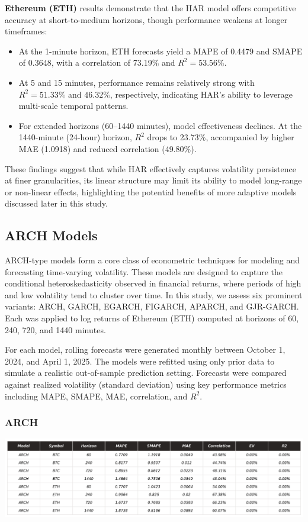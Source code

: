 \documentclass[9pt]{article}
\begin{document}
\begin{multicols}{2}
		\textbf{Ethereum (ETH)} results demonstrate that the HAR model offers competitive accuracy at short-to-medium horizons, though performance weakens at longer timeframes:
		\begin{itemize}
			\item At the 1-minute horizon, ETH forecasts yield a MAPE of 0.4479 and SMAPE of 0.3648, with a correlation of 73.19\% and \( R^2 = 53.56\% \).
			\item At 5 and 15 minutes, performance remains relatively strong with \( R^2 = 51.33\% \) and \( 46.32\% \), respectively, indicating HAR's ability to leverage multi-scale temporal patterns.
			\item For extended horizons (60–1440 minutes), model effectiveness declines. At the 1440-minute (24-hour) horizon, \( R^2 \) drops to 23.73\%, accompanied by higher MAE (1.0918) and reduced correlation (49.80\%).
		\end{itemize}
		
		These findings suggest that while HAR effectively captures volatility persistence at finer granularities, its linear structure may limit its ability to model long-range or non-linear effects, highlighting the potential benefits of more adaptive models discussed later in this study.
		
		\subsection{ARCH Models}
		
		ARCH-type models form a core class of econometric techniques for modeling and forecasting time-varying volatility. These models are designed to capture the conditional heteroskedasticity observed in financial returns, where periods of high and low volatility tend to cluster over time. In this study, we assess six prominent variants: ARCH, GARCH, EGARCH, FIGARCH, APARCH, and GJR-GARCH. Each was applied to log returns of Ethereum (ETH) computed at horizons of 60, 240, 720, and 1440 minutes.
		
		\medskip
		
		For each model, rolling forecasts were generated monthly between October 1, 2024, and April 1, 2025. The models were refitted using only prior data to simulate a realistic out-of-sample prediction setting. Forecasts were compared against realized volatility (standard deviation) using key performance metrics including MAPE, SMAPE, MAE, correlation, and \( R^2 \).
		
		\subsubsection{ARCH}
		\centering
		\includegraphics[width=.95\columnwidth]{img/_KPI_ARCH.png}
		\label{fig:_KPI_ARCH}
		\justifying
		\medskip
		

\end{multicols}
\end{document}
